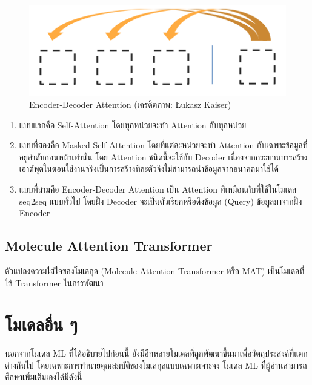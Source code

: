 \begin{figure}[H]
    \centering
    \includegraphics[width=0.6\linewidth]{fig/attention_3_enc-dec.png}
    \caption{Encoder-Decoder Attention (เครดิตภาพ: Łukasz Kaiser)}
    \label{fig:enc_dec_attention}
\end{figure}

\begin{enumerate}
    \item แบบแรกคือ Self-Attention โดยทุกหน่วยจะทำ Attention กับทุกหน่วย

    \item แบบที่สองคือ Masked Self-Attention โดยที่แต่ละหน่วยจะทำ Attention กับเฉพาะข้อมูลที่อยู่ลำดับก่อนหน้าเท่านั้น โดย Attention ชนิดนี้จะใช้กับ Decoder เนื่องจากกระบวนการสร้างเอาต์พุตในตอนใช้งานจริงเป็นการสร้างทีละตัวจึงไม่สามารถนำข้อมูลจากอนาคตมาใช้ได้

    \item แบบที่สามคือ Encoder-Decoder Attention เป็น Attention ที่เหมือนกับที่ใช้ในโมเดล seq2seq แบบทั่วไป โดยฝั่ง Decoder จะเป็นตัวเรียกหรือดึงข้อมูล (Query) ข้อมูลมาจากฝั่ง Encoder
\end{enumerate}

\subsection{Molecule Attention Transformer}
\label{ssec:mol_transformer}

ตัวแปลงความใส่ใจของโมเลกุล (Molecule Attention Transformer หรือ MAT)\autocite{maziarka2020} เป็นโมเดลที่ใช้ Transformer ในการพัฒนา

\section{โมเดลอื่น ๆ}
\label{sec:other_ml_qm_models}

นอกจากโมเดล ML ที่ได้อธิบายไปก่อนนี้ ยังมีอีกหลายโมเดลที่ถูกพัฒนาขึ้นมาเพื่อวัตถุประสงค์ที่แตกต่างกันไป โดยเฉพาะการทำนายคุณสมบัติของโมเลกุลแบบเฉพาะเจาะจง โมเดล ML ที่ผู้อ่านสามารถศึกษาเพิ่มเติมเองได้มีดังนี้

